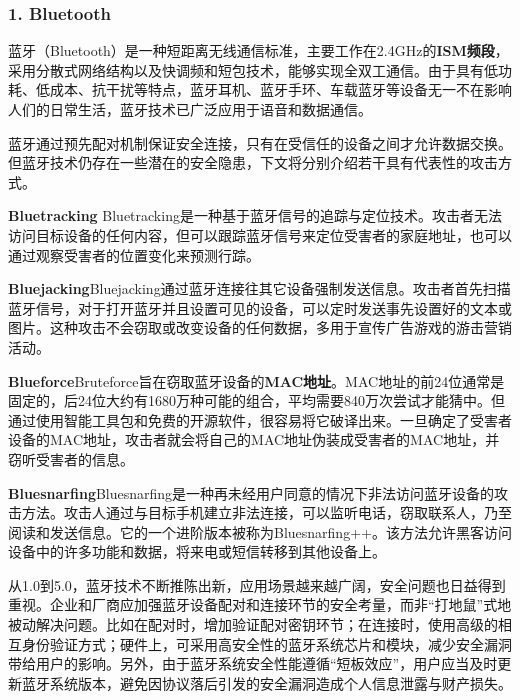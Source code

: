 \subsubsection{\textcolor{myblue}{\textbf{1. Bluetooth}}}
\par 蓝牙（Bluetooth）是一种短距离无线通信标准，主要工作在2.4GHz的\textcolor{myblue}{\textbf{ISM频段}}，采用分散式网络结构以及快调频和短包技术，能够实现全双工通信。由于具有低功耗、低成本、抗干扰等特点，蓝牙耳机、蓝牙手环、车载蓝牙等设备无一不在影响人们的日常生活，蓝牙技术已广泛应用于语音和数据通信。
\par 蓝牙通过预先配对机制保证安全连接，只有在受信任的设备之间才允许数据交换。但蓝牙技术仍存在一些潜在的安全隐患\cite{hassan2018security}，下文将分别介绍若干具有代表性的攻击方式。
\par \textcolor{myblue}{\textbf{Bluetracking}} \quad Bluetracking是一种基于蓝牙信号的追踪与定位技术。攻击者无法访问目标设备的任何内容，但可以跟踪蓝牙信号来定位受害者的家庭地址，也可以通过观察受害者的位置变化来预测行踪。
\par \textcolor{myblue}{\textbf{Bluejacking}}\quad Bluejacking通过蓝牙连接往其它设备强制发送信息。攻击者首先扫描蓝牙信号，对于打开蓝牙并且设置可见的设备，可以定时发送事先设置好的文本或图片。这种攻击不会窃取或改变设备的任何数据，多用于宣传广告游戏的游击营销活动。
\par \textcolor{myblue}{\textbf{Blueforce}}\quad Bruteforce旨在窃取蓝牙设备的\textcolor{myblue}{\textbf{MAC地址}}。MAC地址的前24位通常是固定的，后24位大约有1680万种可能的组合，平均需要840万次尝试才能猜中。但通过使用智能工具包和免费的开源软件，很容易将它破译出来。一旦确定了受害者设备的MAC地址，攻击者就会将自己的MAC地址伪装成受害者的MAC地址，并窃听受害者的信息。
\par \textcolor{myblue}{\textbf{Bluesnarfing}}\quad Bluesnarfing是一种再未经用户同意的情况下非法访问蓝牙设备的攻击方法。攻击人通过与目标手机建立非法连接，可以监听电话，窃取联系人，乃至阅读和发送信息。它的一个进阶版本被称为Bluesnarfing++。该方法允许黑客访问设备中的许多功能和数据，将来电或短信转移到其他设备上。
\par 从1.0到5.0，蓝牙技术不断推陈出新，应用场景越来越广阔，安全问题也日益得到重视。企业和厂商应加强蓝牙设备配对和连接环节的安全考量，而非“打地鼠”式地被动解决问题。比如在配对时，增加验证配对密钥环节；在连接时，使用高级的相互身份验证方式；硬件上，可采用高安全性的蓝牙系统芯片和模块，减少安全漏洞带给用户的影响。另外，由于蓝牙系统安全性能遵循“短板效应”，用户应当及时更新蓝牙系统版本，避免因协议落后引发的安全漏洞造成个人信息泄露与财产损失。


